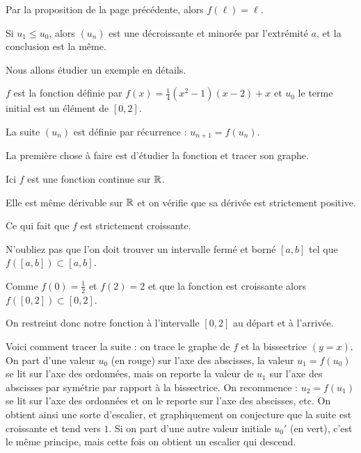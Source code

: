 \change

Par la proposition de la page précédente, alors $f(\ell)=\ell$.


Si $u_1 \le u_0$, alors $(u_n)$ est une décroissante et minorée par l'extrémité $a$, et la conclusion est la même.


\diapo

Nous allons étudier un exemple en détails.

$f$ est la fonction définie par $f(x)=\frac14(x^2-1)(x-2)+x$ et $u_0$ le terme initial est un élément de $[0,2]$.

La suite $(u_n)$ est définie par récurrence : $u_{n+1}=f(u_n)$.

\change

La première chose à faire est d'étudier la fonction et tracer son graphe.

\change

Ici $f$ est une fonction continue sur $\mathbb{R}$.

\change

Elle est même dérivable sur $\mathbb{R}$ et on vérifie que sa dérivée est strictement positive.

\change

Ce qui fait que $f$ est strictement croissante.

\change

N'oubliez pas que l'on doit trouver un intervalle fermé et borné $[a,b]$ tel que 
$f([a,b]) \subset [a,b]$.

Comme $f(0)=\frac12$ et $f(2)=2$ et que la fonction est croissante alors $f([0,2]) \subset [0,2]$.

On restreint donc notre fonction à l'intervalle $[0,2]$ au départ et à l'arrivée.


\diapo


Voici comment tracer la suite : on trace le graphe de $f$ et la bissectrice $(y=x)$.
On part d'une valeur $u_0$ (en rouge) sur l'axe des abscisses, la valeur $u_1=f(u_0)$ se lit
sur l'axe des ordonnées, mais on reporte la valeur de $u_1$ sur l'axe des 
abscisses par symétrie par rapport à la bissectrice.
On recommence : $u_2=f(u_1)$ se lit sur l'axe des ordonnées et on le reporte sur l'axe des abscisses, etc.
On obtient ainsi une sorte d'escalier, et graphiquement on conjecture que la suite est croissante et tend vers $1$.
Si on part d'une autre valeur initiale $u_0'$ (en vert), c'est le même principe, mais cette fois on obtient
un escalier qui descend.



